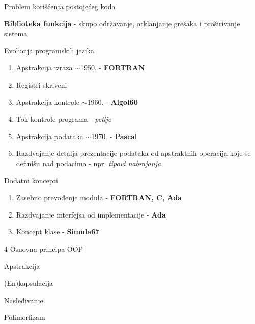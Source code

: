 \documentclass{article}
\newenvironment{xitemize}{%
    
    \itemize
    \larger
}{%
    \enditemize
}
\let\olditemize\itemize
\let\endolditemize\enditemize
\renewenvironment{itemize}{%
    \smaller
    \olditemize
}{%
    \endolditemize
}
\begin{document}
\begin{xitemize}
    \item Problem korišćenja postojećeg koda
    \begin{itemize}
        \item \textbf{Biblioteka funkcija} - skupo održavanje, otklanjanje grešaka i proširivanje sistema
    \end{itemize}
    \item Evolucija programskih jezika
    \begin{enumerate}
        \item Apstrakcija izraza  $\sim$1950. - \textbf{FORTRAN}
        \begin{itemize}
            \item Registri skriveni
        \end{itemize}
        \item Apstrakcija kontrole $\sim$1960. - \textbf{Algol60}
        \begin{itemize}
            \item Tok kontrole programa - \textit{petlje}
        \end{itemize}
        \item Apstrakcija podataka  $\sim$1970. - \textbf{Pascal}
        \begin{itemize}
            \item Razdvajanje detalja prezentacije podataka od apstraktnih operacija koje se definišu nad podacima - npr. \textit{tipovi nabrajanja}
        \end{itemize}
    \end{enumerate}
    \item Dodatni koncepti
    \begin{enumerate}
        \item Zasebno prevođenje modula - \textbf{FORTRAN, C, Ada}
        \item Razdvajanje interfejsa od implementacije - \textbf{Ada}
        \item Koncept klase - \textbf{Simula67}
    \end{enumerate}
    \item 4 Osnovna principa OOP
    \begin{itemize}
        \item Apstrakcija
        \item (En)kapsulacija
        \item \underline{Nasleđivanje}
        \item Polimorfizam
    \end{itemize}
\end{xitemize}
\end{document}
